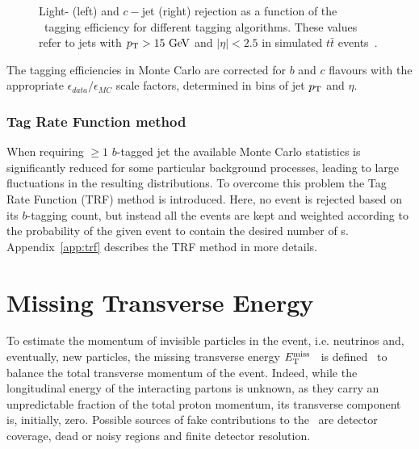 \begin{figure}[tb]\begin{center}
	\caption{Light- (left) and $c-$jet (right) rejection as a function of the \bjet\ tagging efficiency
        for different tagging algorithms. These values refer to jets with $\pt >15\gev$ and 
$|\eta|<2.5$ in simulated $t\bar{t}$ events~\cite{btagging}.\label{fig:btageffs}}
\end{center}\end{figure}

The tagging efficiencies in Monte Carlo are corrected for $b$ and $c$ flavours
with the appropriate $\epsilon_{data}/\epsilon_{MC}$ scale factors,
determined in bins of jet $\pt$ and $\eta$.

\subsubsection{Tag Rate Function method}\label{sec:trf}

When requiring $\geq 1$ $b$-tagged jet the
available Monte Carlo statistics is significantly reduced for 
some particular background processes, leading to large
fluctuations in the resulting distributions.
To overcome this problem the Tag Rate Function (TRF) method is introduced.
Here, no event is rejected based on its $b$-tagging count, 
but instead all the events are 
kept and weighted according to the
probability of the given event to contain the desired number of \bjet s.
Appendix~\ref{app:trf} describes the TRF method in more details.


\section{Missing Transverse Energy}\label{sec:met}

To estimate the momentum of invisible particles in the event, i.e. neutrinos and, eventually, new particles,
the missing transverse energy $\met$~\cite{met} is defined~\cite{topcommon2013} to balance the total transverse momentum of the event.
Indeed, while the longitudinal energy of the interacting partons is unknown, as they carry an unpredictable
fraction of the total proton momentum, its transverse component is, initially, zero.
Possible sources of fake contributions to the \met\ are detector coverage, dead or noisy regions and
finite detector resolution.

